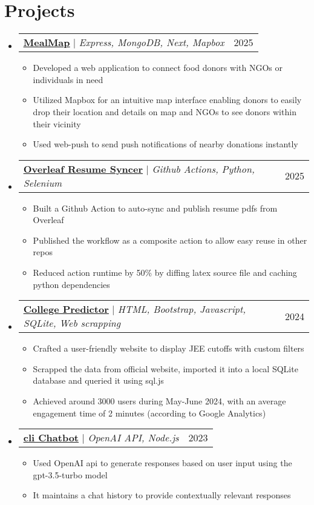 \documentclass[letterpaper,11pt]{article}
\makeatletter
\newcommand{\resumeItem}[1]{
  \item\small{
    {#1 \vspace{-5pt}}
  }
}
\newcommand{\resumeProjectHeading}[2]{
    \item
    \begin{tabular*}{0.97\textwidth}{l@{\extracolsep{\fill}}r}
      \small#1 & #2 \\
    \end{tabular*}\vspace{0pt}
}
\newcommand{\resumeSubHeadingListStart}{\begin{itemize}[leftmargin=0.15in, label={}]}
\newcommand{\resumeSubHeadingListEnd}{\end{itemize}}
\newcommand{\resumeItemListStart}{\begin{itemize}}
\newcommand{\resumeItemListEnd}{\end{itemize}\vspace{3pt}}
\makeatother
\begin{document}
\section{Projects}
    \resumeSubHeadingListStart
        \resumeProjectHeading
          {\textbf{\href{https://github.com/Sbrjt/mealmap}{\href{}{\underline{MealMap}}}}  $|$ \emph{Express, MongoDB, Next, Mapbox}}{2025}
          \resumeItemListStart
            \resumeItem{Developed a web application to connect food donors with NGOs or individuals in need}
            \resumeItem{Utilized Mapbox for an intuitive map interface enabling donors to easily drop their location and details on map and NGOs to see donors within their vicinity}
            \resumeItem{Used web-push to send push notifications of nearby donations instantly}
          \resumeItemListEnd
        \resumeProjectHeading
          {\textbf{\href{https://github.com/Sbrjt/overleaf-resume-downloader}{\href{}{\underline{Overleaf Resume Syncer}}}}  $|$ \emph{Github Actions, Python, Selenium}}{2025}
          \resumeItemListStart
            \resumeItem{Built a Github Action to auto-sync and publish resume pdfs from Overleaf}
            \resumeItem{Published the workflow as a composite action to allow easy reuse in other repos}
             \resumeItem{Reduced action runtime by 50\% by diffing latex source file and caching python dependencies}
          \resumeItemListEnd
        \resumeProjectHeading
          {\textbf{\href{https://github.com/Sbrjt/josaa-cutoffs}{\href{}{\underline{College Predictor}}}} $|$ \emph{HTML, Bootstrap, Javascript, SQLite, Web scrapping}}{2024}
          \resumeItemListStart
            \resumeItem{Crafted a user-friendly website to display JEE cutoffs with custom filters}
            \resumeItem{Scrapped the data from official website, imported it into a local SQLite database and queried it using sql.js}
            \resumeItem{Achieved around 3000 users during May-June 2024, with an average engagement time of 2 minutes (according to Google Analytics)}
          \resumeItemListEnd
          
        \resumeProjectHeading
          {\textbf{\href{https://github.com/Sbrjt/Chatbot}{\href{}{\underline{cli Chatbot}}}}  $|$ \emph{OpenAI API, Node.js}}{2023}
          \resumeItemListStart
            \resumeItem{Used OpenAI api to generate responses based on user input using the gpt-3.5-turbo model}
            \resumeItem{It maintains a chat history to provide contextually relevant responses}
          \resumeItemListEnd
    \resumeSubHeadingListEnd
\end{document}
